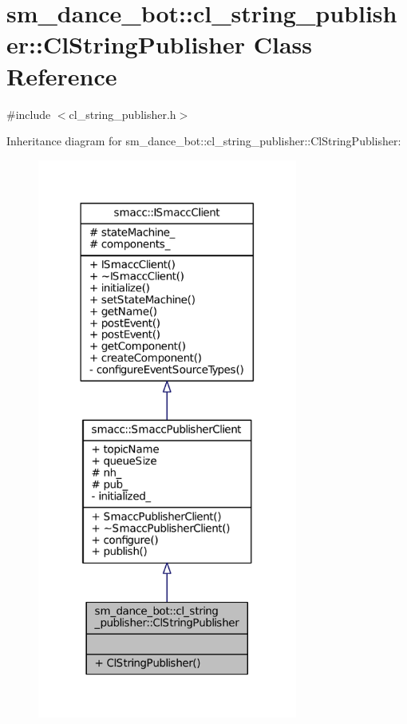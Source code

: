 \hypertarget{classsm__dance__bot_1_1cl__string__publisher_1_1ClStringPublisher}{}\section{sm\+\_\+dance\+\_\+bot\+:\+:cl\+\_\+string\+\_\+publisher\+:\+:Cl\+String\+Publisher Class Reference}
\label{classsm__dance__bot_1_1cl__string__publisher_1_1ClStringPublisher}


{\ttfamily \#include $<$cl\+\_\+string\+\_\+publisher.\+h$>$}



Inheritance diagram for sm\+\_\+dance\+\_\+bot\+:\+:cl\+\_\+string\+\_\+publisher\+:\+:Cl\+String\+Publisher\+:
\nopagebreak
\begin{figure}[H]
\begin{center}
\leavevmode
\includegraphics[width=242pt]{classsm__dance__bot_1_1cl__string__publisher_1_1ClStringPublisher__inherit__graph}
\end{center}
\end{figure}


